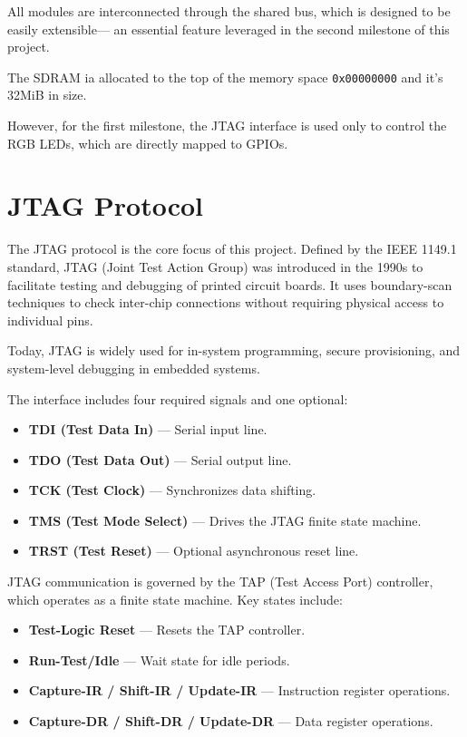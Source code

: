 \documentclass[a4paper,11pt,oneside]{report}
\begin{document}
All modules are interconnected through the shared bus,  
which is designed to be easily extensible—  
an essential feature leveraged in the second milestone of this project.  

The SDRAM ia allocated to the top of the memory space \texttt{0x00000000} and it's 32MiB in size.

However, for the first milestone,  
the JTAG interface is used only to control the RGB LEDs,  
which are directly mapped to GPIOs.  

\section{JTAG Protocol}
\label{sec:JTAG}

The JTAG protocol is the core focus of this project.  
Defined by the IEEE 1149.1 standard,  
JTAG (Joint Test Action Group) was introduced in the 1990s  
to facilitate testing and debugging of printed circuit boards.  
It uses boundary-scan techniques to check inter-chip connections  
without requiring physical access to individual pins.  

Today, JTAG is widely used for in-system programming, secure provisioning,  
and system-level debugging in embedded systems.  

The interface includes four required signals and one optional:  

\begin{itemize}
    \item \textbf{TDI (Test Data In)} — Serial input line.  
    \item \textbf{TDO (Test Data Out)} — Serial output line.  
    \item \textbf{TCK (Test Clock)} — Synchronizes data shifting.  
    \item \textbf{TMS (Test Mode Select)} — Drives the JTAG finite state machine.  
    \item \textbf{TRST (Test Reset)} — Optional asynchronous reset line.  
\end{itemize}

JTAG communication is governed by the TAP (Test Access Port) controller,  
which operates as a finite state machine.  
Key states include:  

\begin{itemize}
    \item \textbf{Test-Logic Reset} — Resets the TAP controller.  
    \item \textbf{Run-Test/Idle} — Wait state for idle periods.  
    \item \textbf{Capture-IR / Shift-IR / Update-IR} — Instruction register operations.  
    \item \textbf{Capture-DR / Shift-DR / Update-DR} — Data register operations.  
\end{itemize}
\end{document}
